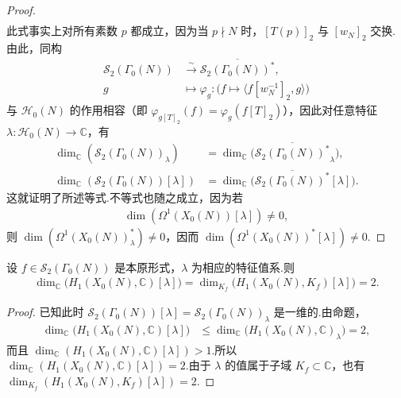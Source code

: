 \begin{proof}
\begin{align*}
\end{align*}
此式事实上对所有素数 $p$ 都成立，因为当 $p\nmid N$ 时，$[T(p)]_2$ 与 $[w_N]_2$ 交换.由此，同构
\begin{align*}
\mathcal S_2(\Gamma_0(N))&\xrightarrow{\sim}\overline{\mathcal S_2(\Gamma_0(N))^*},\\
g&\longmapsto\varphi_g:\bigl(f\longmapsto\langle f[w_N^{-1}]_2,g\rangle\bigr)
\end{align*}
与 $\mathcal H_0(N)$ 的作用相容（即 $\varphi_{g[T]_2}(f)=\varphi_g(f[T]_2)$），因此对任意特征 $\lambda:\mathcal H_0(N)\longrightarrow\mathbb C$，有
\begin{align*}
\dim_{\mathbb C}(\mathcal S_2(\Gamma_0(N))_\lambda)
&=\dim_{\mathbb C}\bigl(\overline{\mathcal S_2(\Gamma_0(N))^*}_\lambda\bigr),\\
\dim_{\mathbb C}(\mathcal S_2(\Gamma_0(N))[\lambda])
&=\dim_{\mathbb C}\bigl(\overline{\mathcal S_2(\Gamma_0(N))^*}[\lambda]\bigr).
\end{align*}
这就证明了所述等式.不等式也随之成立，因为若
\begin{align*}
\dim(\Omega^1(X_0(N))[\lambda])\ne0,
\end{align*}
则 $\dim(\Omega^1(X_0(N))^*_{\lambda})\ne0$，因而 $\dim(\Omega^1(X_0(N))^*[\lambda])\ne0$.

\end{proof}

\begin{corollary*}

设 $f\in\mathcal S_2(\Gamma_0(N))$ 是本原形式，$\lambda$ 为相应的特征值系.则
\begin{align*}
\dim_{\mathbb C}\bigl(H_1(X_0(N),\mathbb C)[\lambda]\bigr)
=\dim_{K_f}\bigl(H_1(X_0(N),K_f)[\lambda]\bigr)=2.
\end{align*}
\end{corollary*}

\begin{proof}

已知此时 $\mathcal S_2(\Gamma_0(N))[\lambda]=\mathcal S_2(\Gamma_0(N))_\lambda$ 是一维的.由命题，
\begin{align*}
\dim_{\mathbb C}\bigl(H_1(X_0(N),\mathbb C)[\lambda]\bigr)
&\leqslant\dim_{\mathbb C}\bigl(H_1(X_0(N),\mathbb C)_\lambda\bigr)=2,
\end{align*}
而且 $\dim_{\mathbb C}(H_1(X_0(N),\mathbb C)[\lambda])>1$.所以 $\dim_{\mathbb C}(H_1(X_0(N),\mathbb C)[\lambda])=2$.由于 $\lambda$ 的值属于子域 $K_f\subset\mathbb C$，也有 $\dim_{K_f}(H_1(X_0(N),K_f)[\lambda])=2$.

\end{proof}

